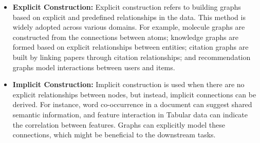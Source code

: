 \begin{itemize}[leftmargin=*]
    \item \textbf{Explicit Construction:} Explicit construction refers to building graphs based on explicit and predefined relationships in the data. This method is widely adopted across various domains. For example, molecule graphs are constructed from the connections between atoms; knowledge graphs are formed based on explicit relationships between entities; citation graphs are built by linking papers through citation relationships; and recommendation graphs model interactions between users and items.

    \item \textbf{Implicit Construction:} Implicit construction is used when there are no explicit relationships between nodes, but instead, implicit connections can be derived. For instance, word co-occurrence in a document can suggest shared semantic information, and feature interaction in Tabular data can indicate the correlation between features. Graphs can explicitly model these connections, which might be beneficial to the downstream tasks.
\end{itemize}


